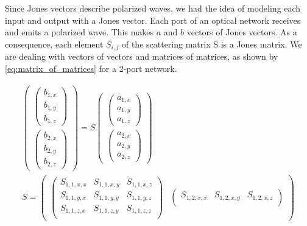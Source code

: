 Since Jones vectors describe polarized waves, we had the idea of modeling each input and output with a Jones vector.
Each port of an optical network receives and emits a polarized wave.
This makes $a$ and $b$ vectors of Jones vectors.
As a consequence, each element $S_{i, j}$ of the scattering matrix S is a Jones matrix.
We are dealing with vectors of vectors and matrices of matrices, as shown by \cref{eq:matrix_of_matrices} for a 2-port network.

\begin{equation}
    \begin{gathered}
    \begin{pmatrix}
        \begin{pmatrix}
            b_{1, x} \\ b_{1, y} \\ b_{1, z}
        \end{pmatrix}
        \\
        \begin{pmatrix}
            b_{2, x} \\ b_{2, y} \\ b_{2, z}
        \end{pmatrix}
    \end{pmatrix}
    =
    S
    \begin{pmatrix}
        \begin{pmatrix}
            a_{1, x} \\ a_{1, y} \\ a_{1, z}
        \end{pmatrix}
        \\
        \begin{pmatrix}
            a_{2, x} \\ a_{2, y} \\ a_{2, z}
        \end{pmatrix}
    \end{pmatrix}
    \\
    S =
    \begin{pmatrix}
        \begin{pmatrix}
            S_{1, 1, x, x} & S_{1, 1, x, y} & S_{1, 1, x, z} \\
            S_{1, 1, y, x} & S_{1, 1, y, y} & S_{1, 1, y, z} \\
            S_{1, 1, z, x} & S_{1, 1, z, y} & S_{1, 1, z, z} \\
        \end{pmatrix}
        &
        \begin{pmatrix}
            S_{1, 2, x, x} & S_{1, 2, x, y} & S_{1, 2, x, z} \\

\end{pmatrix}
\end{pmatrix}
\end{gathered}
\end{equation}
